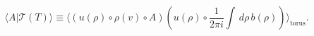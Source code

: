 \begin{equation}\label{eq:TofTDef}
  \langle A | \mathcal{T}(T)\rangle \equiv \langle ( u (\rho) \circ
 \rho(v) \circ A) ( u(\rho)\circ \frac{1}{2 \pi i}\int\, d\rho\,
 b(\rho)) \rangle_{\text{torus}}.
\end{equation}

